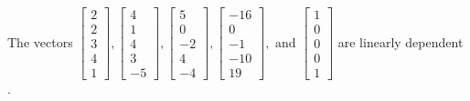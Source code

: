 \begin{exercise}
\begin{exerciseStatement}
  \end{exerciseStatement}
  \begin{exerciseAnswer}
   The vectors \(\left[\begin{array}{r}
2 \\
2 \\
3 \\
4 \\
1
\end{array}\right] , \left[\begin{array}{r}
4 \\
1 \\
4 \\
3 \\
-5
\end{array}\right] , \left[\begin{array}{r}
5 \\
0 \\
-2 \\
4 \\
-4
\end{array}\right] , \left[\begin{array}{r}
-16 \\
0 \\
-1 \\
-10 \\
19
\end{array}\right] , \text{ and } \left[\begin{array}{r}
1 \\
0 \\
0 \\
0 \\
1
\end{array}\right]\) are 
  	 linearly dependent  .
  


  \end{exerciseAnswer}
\end{exercise}